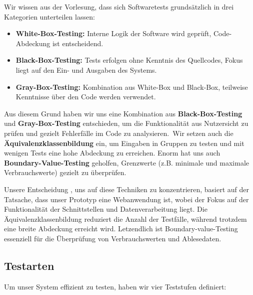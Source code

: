 Wir wissen aus der Vorlesung, dass sich Softwaretests grundsätzlich in drei Kategorien unterteilen lassen:

\begin{itemize}
	\item \textbf{White-Box-Testing:} Interne Logik der Software wird geprüft, Code-Abdeckung ist entscheidend.
	\item \textbf{Black-Box-Testing:} Tests erfolgen ohne Kenntnis des Quellcodes, Fokus liegt auf den Ein- und Ausgaben des Systems.
	\item \textbf{Gray-Box-Testing:} Kombination aus White-Box und Black-Box, teilweise Kenntnisse über den Code werden verwendet.
\end{itemize}

Aus diesem Grund  haben wir uns eine Kombination aus \textbf{Black-Box-Testing} und \textbf{Gray-Box-Testing} entschieden, um die Funktionalität aus Nutzersicht zu prüfen und gezielt Fehlerfälle im Code zu analysieren.\
Wir setzen auch die \textbf{Äquivalenzklassenbildung} ein, um Eingaben in Gruppen zu testen und mit wenigen Tests eine hohe Abdeckung zu erreichen. Enorm hat uns auch \textbf{Boundary-Value-Testing} geholfen, Grenzwerte (z.B. minimale und maximale Verbrauchswerte) gezielt zu überprüfen.\par

Unsere Entscheidung , uns auf diese Techniken zu konzentrieren, basiert auf der Tatsache, dass unser
Prototyp eine Webanwendung ist, wobei der Fokus auf der Funktionalität der Schnittstellen und Datenverarbeitung liegt. Die Äquivalenzklassenbildung reduziert die Anzahl der Testfälle, während trotzdem eine breite Abdeckung erreicht wird.
Letzendlich ist Boundary-value-Testing essenziell für die Überprüfung von Verbrauchswerten und Ablesedaten.\par

\subsection{Testarten}

Um unser System effizient zu testen, haben wir vier Teststufen definiert:

